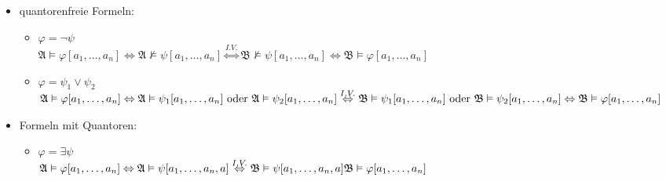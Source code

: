 \documentclass[a4paper]{scrartcl}
\begin{document}
\begin{itemize}
            \item quantorenfreie Formeln:\\
                \begin{itemize}
                    \item $\varphi = \neg \psi$\\
                        $\mathfrak{A} \vDash \varphi[a_1,\dots,a_n] \Leftrightarrow \mathfrak{A} \nvDash \psi[a_1,\dots,a_n]
                        \overset{I.V.}{\Leftrightarrow} \mathfrak{B} \nvDash \psi[a_1,\dots,a_n] \Leftrightarrow \mathfrak{B} \vDash \varphi[a_1,\dots,a_n]$
                    \item $\varphi = \psi_1 \lor \psi_2$\\
                        $\mathfrak{A} \vDash \varphi[a_1,\dots,a_n]\\
                        \Leftrightarrow \mathfrak{A} \vDash \psi_1[a_1,\dots,a_n] \text{ oder } \mathfrak{A} \vDash \psi_2[a_1,\dots,a_n]\\
                        \overset{I.V.}{\Leftrightarrow} \mathfrak{B} \vDash \psi_1[a_1,\dots,a_n] \text{ oder } \mathfrak{B} \vDash \psi_2[a_1,\dots,a_n]\\
                        \Leftrightarrow \mathfrak{B} \vDash \varphi[a_1,\dots,a_n]$\\
                \end{itemize}

            \item Formeln mit Quantoren:\\
                \begin{itemize}
                    \item $\varphi = \exists \psi$\\
                        $\mathfrak{A} \vDash \varphi[a_1,\dots,a_n]\\
                        \Leftrightarrow \mathfrak{A} \vDash \psi[a_1,\dots,a_n,a]\\
                        \overset{I.V.}{\Leftrightarrow} \mathfrak{B} \vDash \psi[a_1,\dots,a_n,a]\\
                        \mathfrak{B} \vDash \varphi[a_1,\dots,a_n]$\\
                \end{itemize}
                        
        \end{itemize}

\section*{}%
\label{sec:aufgabe_2}
\end{document}
